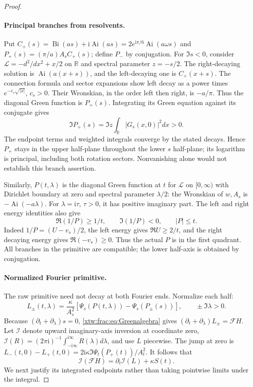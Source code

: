 \documentclass[11pt]{article}
\theoremstyle{remark}\newtheorem{remark}[theorem]{Remark}
\newcommand{\R}{\mathbb R}
\newcommand{\Ai}{\operatorname{Ai}}
\newcommand{\Bi}{\operatorname{Bi}}
\newcommand{\ii}{\mathrm i}
\newcommand{\FF}{\mathcal F}
\newcommand{\inv}{\mathcal I}
\begin{document}
\begin{proof}
\paragraph{Principal branches from resolvents.}
Put $C_+(s)=\Bi(as)+\ii\Ai(as)=2e^{\ii\pi/6}\Ai(a\omega s)$
and $P_+(s)=(\pi/a)A_sC_+(s)$; define $P_-$ by conjugation.
For $\Im s<0$, consider $\mathcal L=-d^2/dx^2+x/2$ on $\R$ and
spectral parameter $z=-s/2$.
The right-decaying solution is $\Ai(a(x+s))$, and the left-decaying one
is $C_+(x+s)$. The connection formula and sector expansions show left
decay as a power times $e^{-c_s\sqrt{|x|}}$, $c_s>0$.
Their Wronskian, in the order left then right, is $-a/\pi$.
Thus the diagonal Green function is $P_+(s)$.
Integrating its Green equation against its conjugate gives
\begin{equation}\label{xtw:frac:eq:resolventpositive}
 \Im P_+(s)=\Im z\int_\R|G_s(x,0)|^2dx>0.
\end{equation}
The endpoint terms and weighted integrals converge by the stated decays.
Hence $P_+$ stays in the upper half-plane throughout the lower $s$
half-plane; its logarithm is principal, including both rotation sectors.
Nonvanishing alone would not establish this branch assertion.

Similarly, $P(t,\lambda)$ is the diagonal Green function at $t$ for
$\mathcal L$ on $[0,\infty)$ with Dirichlet boundary at zero and
spectral parameter $\lambda/2$: the Wronskian of $w,A_s$ is
$-\Ai(-a\lambda)$. For $\lambda=\ii\tau$, $\tau>0$, it has positive
imaginary part. The left and right energy identities also give
\begin{equation}\label{xtw:frac:eq:Pbounds}
 \Re(1/P)\ge1/t,\qquad\Im(1/P)<0,\qquad |P|\le t.
\end{equation}
Indeed $1/P=(U-v_s)/2$, the left energy gives $\Re U\ge2/t$,
and the right decaying energy gives $\Re(-v_s)\ge0$.
Thus the actual $P$ is in the first quadrant. All branches in the
primitive are compatible; the lower half-axis is obtained by conjugation.

\paragraph{Normalized Fourier primitive.}
The raw primitive need not decay at both Fourier ends. Normalize each half:
\[
 L_\pm(t,\lambda)=\frac\kappa{A_s^2}
                    [\Psi_s(P(t,\lambda))-\Psi_s(P_\pm(s))],
 \qquad \pm\Im\lambda>0.
\]
Because $(\partial_t+\partial_\lambda)s=0$, \eqref{xtw:frac:eq:Greenalgebra} gives
$(\partial_t+\partial_\lambda)L_\pm=\FF H$.
Let $\inv$ denote upward imaginary-axis inversion at coordinate zero,
$\inv(R)=(2\pi\ii)^{-1}\int_{-\ii\infty}^{\ii\infty}R(\lambda)d\lambda$,
and use $L$ piecewise. The jump at zero is
$L_-(t,0)-L_+(t,0)=2\ii\kappa\Im\Psi_t(P_+(t))/A_t^2$.
It follows that
\begin{equation}\label{xtw:frac:eq:jump}
 \inv(\FF H)=\partial_t\inv(L)+\kappa S(t).
\end{equation}
We next justify its integrated endpoints rather than taking pointwise
limits under the integral.


\end{proof}
\end{document}
